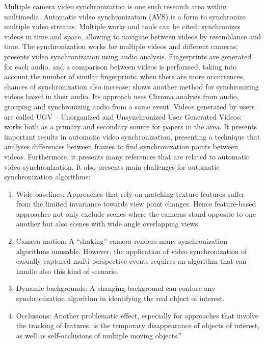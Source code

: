 \documentclass{sig-alternate-05-2015}
\begin{document}
Multiple camera video synchronization is one such research area within multimedia. Automatic video synchronization (AVS) is a form to synchronize multiple video streams. Multiple works and tools can be cited: \cite{wang2014videosnapping} synchronizes videos in time and space, allowing to navigate between videos by resemblance and time. The synchronization works for multiple videos and different cameras; \cite{su2012making} presents video synchronization using audio analysis. Fingerprints are generated for each audio, and a comparison between videos is performed, taking into account the number of similar fingerprints: when there are more occurrences, chances of synchronization also increase; \cite{bano2015discovery} shows another method for synchronizing videos based in their audio. Its approach uses Chroma analysis from audio, grouping and synchronizing audio from a same event. Videos generated by users are called UGV – Unorganized and Unsynchronized User Generated Videos; \cite{ schweiger2013fully} works both as a primary and secondary source for papers in the area. It presents important results in automatic video synchronization, presenting a technique that analyses differences between frames to find synchronization points between videos. Furthermore, it presents many references that are related to automatic video synchronization. It also presents main challenges for automatic synchronization algorithms:
\begin{enumerate}
	\item Wide baselines: Approaches that rely on matching texture features suffer from the limited invariance towards view point changes. Hence feature-based approaches not only exclude scenes where the cameras stand opposite to one another but also scenes with wide angle overlapping views.
	\item Camera motion: A “shaking” camera renders many synchronization algorithms unusable. However, the application of video synchronization of casually captured multi-perspective events requires an algorithm that can handle also this kind of scenario.
	\item Dynamic backgrounds: A changing background can confuse any synchronization algorithm in identifying the real object of interest.
	\item Occlusions: Another problematic effect, especially for approaches that involve the tracking of features, is the temporary disappearance of objects of interest, as well as self-occlusions of multiple moving objects.”
\end{enumerate}
\end{document}
